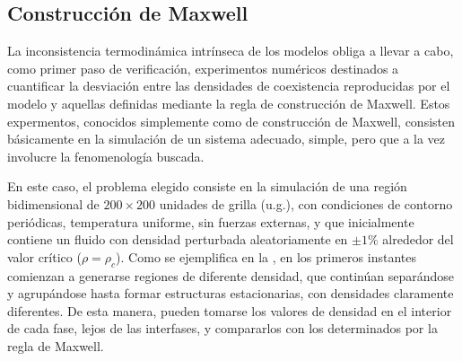 \subsection{Construcci\'on de Maxwell}

La inconsistencia termodin\'amica intr\'inseca de los modelos \pp{} obliga a llevar a cabo, como primer paso de verificaci\'on, experimentos num\'ericos destinados a cuantificar la desviaci\'on entre las densidades de coexistencia reproducidas por el modelo y aquellas definidas mediante la regla de construcci\'on de Maxwell. Estos expermentos, conocidos simplemente como de construcci\'on de Maxwell, consisten b\'asicamente en la simulaci\'on de un sistema adecuado, simple, pero que a la vez involucre la fenomenolog\'ia buscada.

En este caso, el problema elegido consiste en la simulaci\'on de una regi\'on bidimensional de $200 \times 200$ unidades de grilla (u.g.), con condiciones de contorno peri\'odicas, temperatura uniforme, sin fuerzas externas, y que inicialmente contiene un fluido con densidad perturbada aleatoriamente en  $\pm 1\%$ alrededor del valor cr\'itico ($\rho=\rho_c$). Como se ejemplifica en la , en los primeros instantes comienzan a generarse regiones de diferente densidad, que contin\'uan separ\'andose y agrup\'andose hasta formar estructuras estacionarias, con densidades claramente diferentes. De esta manera, pueden tomarse los valores de densidad en el interior de cada fase, lejos de las interfases, y compararlos con los determinados por la regla de Maxwell.

